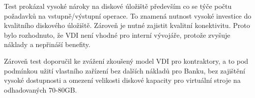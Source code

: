Test prokázal vysoké nároky na diskové úložiště především co se týče počtu požadavků na vstupně/výstupní operace. To znamená nutnost vysoké investice do kvalitního diskového úložiště. Zároveň je nutné zajistit kvalitní konektivitu. Proto bylo rozhodnuto, že VDI není vhodné pro interní vývojáře, protože zvyšuje náklady a nepřináší benefity.

Zároveň test doporučil ke zvážení zkoušený model VDI pro kontraktory, a to pod podmínkou užití vlastního zařízení bez dalších nákladů pro Banku, bez zajištění vysoké dostupnosti a omezení velikosti diskové kapacity pro virtuální stroje na odhadovaných 70-80GB.